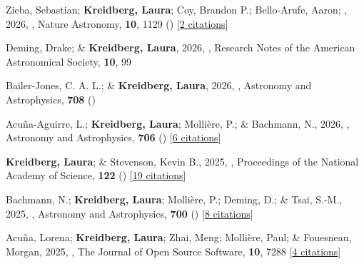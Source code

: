 \item[{\color{numcolor}\scriptsize31}] Zieba, Sebastian; \textbf{Kreidberg, Laura}; Coy, Brandon P.; Bello-Arufe, Aaron; \etal, 2026, , Nature Astronomy, \textbf{10}, 1129 () [\href{https://ui.adsabs.harvard.edu/abs/2026NatAs..10.1129Z}{2 citations}]

\item[{\color{numcolor}\scriptsize30}] Deming, Drake; \& \textbf{Kreidberg, Laura}, 2026, , Research Notes of the American Astronomical Society, \textbf{10}, 99

\item[{\color{numcolor}\scriptsize29}] Bailer-Jones, C. A. L.; \& \textbf{Kreidberg, Laura}, 2026, , Astronomy and Astrophysics, \textbf{708} ()

\item[{\color{numcolor}\scriptsize28}] Acu{\~n}a-Aguirre, L.; \textbf{Kreidberg, Laura}; Molli{\`e}re, P.; \& Bachmann, N., 2026, , Astronomy and Astrophysics, \textbf{706} () [\href{https://ui.adsabs.harvard.edu/abs/2026A&A...706A.263A}{6 citations}]

\item[{\color{numcolor}\scriptsize27}] \textbf{Kreidberg, Laura}; \& Stevenson, Kevin B., 2025, , Proceedings of the National Academy of Science, \textbf{122} () [\href{https://ui.adsabs.harvard.edu/abs/2025PNAS..12216190K}{19 citations}]

\item[{\color{numcolor}\scriptsize26}] Bachmann, N.; \textbf{Kreidberg, Laura}; Molli{\`e}re, P.; Deming, D.; \& Tsai, S.-M., 2025, , Astronomy and Astrophysics, \textbf{700} () [\href{https://ui.adsabs.harvard.edu/abs/2025A&A...700A.105B}{8 citations}]

\item[{\color{numcolor}\scriptsize25}] Acu{\~n}a, Lorena; \textbf{Kreidberg, Laura}; Zhai, Meng; Molli{\`e}re, Paul; \& Fouesneau, Morgan, 2025, , The Journal of Open Source Software, \textbf{10}, 7288 [\href{https://ui.adsabs.harvard.edu/abs/2025JOSS...10.7288A}{4 citations}]

